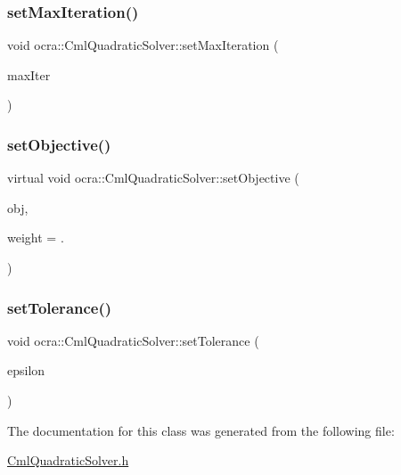 \hypertarget{classocra_1_1CmlQuadraticSolver_a47a17923b7fdf4d8137fb41e240831d6}{}\label{classocra_1_1CmlQuadraticSolver_a47a17923b7fdf4d8137fb41e240831d6} 
\subsubsection{\texorpdfstring{set\+Max\+Iteration()}{setMaxIteration()}}
{\footnotesize\ttfamily void ocra\+::\+Cml\+Quadratic\+Solver\+::set\+Max\+Iteration (\begin{DoxyParamCaption}\item[{cfl\+\_\+size\+\_\+t}]{max\+Iter }\end{DoxyParamCaption})}

\hypertarget{classocra_1_1CmlQuadraticSolver_ad286753e3e35fa17f4aef9f8a75bd5b1}{}\label{classocra_1_1CmlQuadraticSolver_ad286753e3e35fa17f4aef9f8a75bd5b1} 
\subsubsection{\texorpdfstring{set\+Objective()}{setObjective()}}
{\footnotesize\ttfamily virtual void ocra\+::\+Cml\+Quadratic\+Solver\+::set\+Objective (\begin{DoxyParamCaption}\item[{\hyperlink{classocra_1_1QuadraticFunction}{Quadratic\+Function} $\ast$}]{obj,  }\item[{\hyperlink{namespaceocra_af4478308ca113669e67d72f9a3050469}{real}}]{weight = {.} }\end{DoxyParamCaption})\hspace{0.3cm}{\ttfamily [virtual]}}

\hypertarget{classocra_1_1CmlQuadraticSolver_a6c508788b75053d2bbcc7a3fee4ba26e}{}\label{classocra_1_1CmlQuadraticSolver_a6c508788b75053d2bbcc7a3fee4ba26e} 
\subsubsection{\texorpdfstring{set\+Tolerance()}{setTolerance()}}
{\footnotesize\ttfamily void ocra\+::\+Cml\+Quadratic\+Solver\+::set\+Tolerance (\begin{DoxyParamCaption}\item[{double}]{epsilon }\end{DoxyParamCaption})}



The documentation for this class was generated from the following file\+:\begin{DoxyCompactItemize}
\item 
\hyperlink{CmlQuadraticSolver_8h}{Cml\+Quadratic\+Solver.\+h}\end{DoxyCompactItemize}
